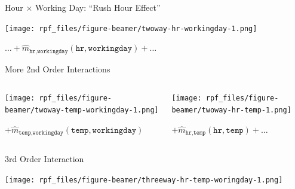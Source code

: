 \documentclass[aspectratio=169,12pt]{beamer}
\begin{document}
\begin{frame}{Hour \(\times\) Working Day: ``Rush Hour Effect''}
\label{hour-times-working-day-rush-hour-effect}
\begin{center}
\texttt{[image: rpf\_files/figure-beamer/twoway-hr-workingday-1.png]}
\end{center}

\begin{center}

$\ldots + \hat{m}_{\texttt{hr}, \texttt{workingday}}(\texttt{hr}, \texttt{workingday}) + \ldots$

\end{center}
\end{frame}

\begin{frame}{More 2nd Order Interactions}
\label{more-2nd-order-interactions}
\begin{columns}[T]
\begin{column}[c]{0.5\linewidth}
\begin{center}
\texttt{[image: rpf\_files/figure-beamer/twoway-temp-workingday-1.png]}
\end{center}

\(+ \hat{m}_{\texttt{temp}, \texttt{workingday}}(\texttt{temp}, \texttt{workingday})\)
\end{column}

\pause

\begin{column}[c]{0.5\linewidth}
\begin{center}
\texttt{[image: rpf\_files/figure-beamer/twoway-hr-temp-1.png]}
\end{center}

\(+ \hat{m}_{\texttt{hr}, \texttt{temp}}(\texttt{hr}, \texttt{temp}) + \ldots\)
\end{column}
\end{columns}
\end{frame}

\begin{frame}{3rd Order Interaction}
\label{rd-order-interaction}
\begin{center}
\texttt{[image: rpf\_files/figure-beamer/threeway-hr-temp-woringday-1.png]}
\end{center}
\end{frame}
\end{document}
